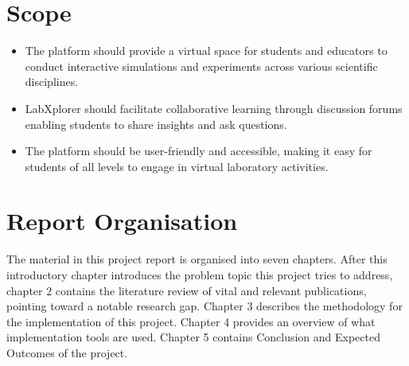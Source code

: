 \section{Scope}

\begin{itemize}
    \item The platform should provide a virtual space for students and educators to conduct interactive simulations and experiments across various scientific disciplines.
    \item LabXplorer should facilitate collaborative learning through discussion forums enabling students to share insights and ask questions.
    \item The platform should be user-friendly and accessible, making it easy for students of all levels to engage in virtual laboratory activities.
    
\end{itemize}
\section{Report Organisation}
The material in this project report is organised into seven chapters. After this introductory chapter introduces the problem topic this project tries to address, chapter 2 contains the literature review of vital and relevant publications, pointing toward a notable research gap. Chapter 3 describes the methodology for the implementation of this project. Chapter 4 provides an overview of what implementation tools are used. Chapter 5 contains Conclusion and Expected Outcomes of the project.